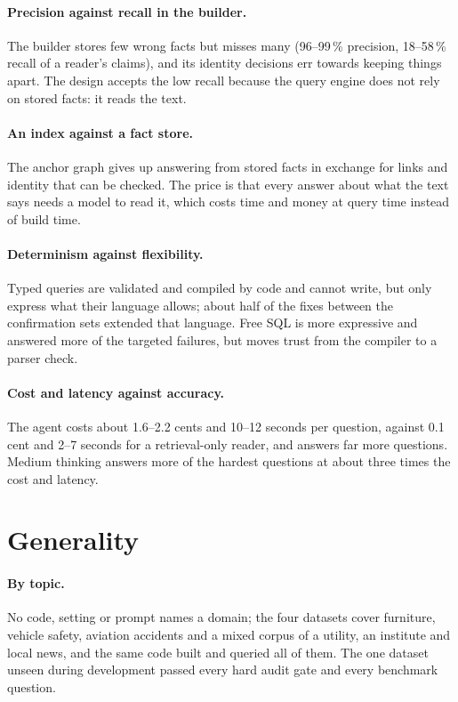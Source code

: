 \paragraph{Precision against recall in the builder.} The builder stores few wrong facts but misses many (96--99\,\%
precision, 18--58\,\% recall of a reader's claims), and its identity decisions err towards keeping things apart. The
design accepts the low recall because the query engine does not rely on stored facts: it reads the text.

\paragraph{An index against a fact store.} The anchor graph gives up answering from stored facts in exchange for
links and identity that can be checked. The price is that every answer about what the text says needs a model to read
it, which costs time and money at query time instead of build time.

\paragraph{Determinism against flexibility.} Typed queries are validated and compiled by code and cannot write, but
only express what their language allows; about half of the fixes between the confirmation sets extended that
language. Free SQL
is more expressive and answered more of the targeted failures, but moves trust from the compiler to a parser check.

\paragraph{Cost and latency against accuracy.} The agent costs about 1.6--2.2 cents and 10--12 seconds per question, against
0.1 cent and 2--7 seconds for a retrieval-only reader, and answers far more questions. Medium thinking answers more of
the hardest questions at about three times the cost and latency.

\section{Generality}\label{sec:ch08-generality}

\paragraph{By topic.} No code, setting or prompt names a domain; the four datasets cover furniture, vehicle safety,
aviation accidents and a mixed corpus of a utility, an institute and local news, and the same code built and queried
all of them. The one dataset unseen during development passed every hard audit gate and every benchmark question.

